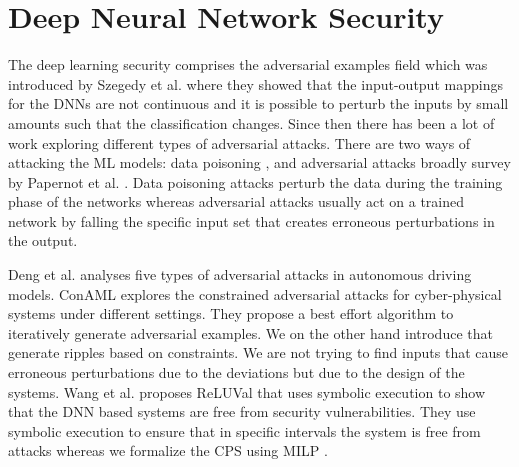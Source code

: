 \section{Deep Neural Network Security}

The deep learning security comprises the adversarial examples field which was introduced by Szegedy et al. \cite{Szegedy2013IntriguingPO} where they showed that the input-output mappings for the DNNs are not continuous and it is possible to perturb the inputs by small amounts such that the classification changes. Since then there has been a lot of work exploring different types of adversarial attacks. There are two ways of attacking the \ac{ML} models: data poisoning \cite{DBLP:journals/corr/abs-1903-01666}, and adversarial attacks broadly survey by Papernot et al. \cite{DBLP:journals/corr/PapernotMSW16}. Data poisoning attacks perturb the data during the training phase of the networks whereas adversarial attacks usually act on a trained network by falling the specific input set that creates erroneous perturbations in the output. 



 Deng et al. \cite{deng2020analysis} analyses five types of adversarial attacks in autonomous driving models.  ConAML \cite{li2020conaml} explores the constrained adversarial attacks for cyber-physical systems under different settings. They propose a best effort algorithm to iteratively generate adversarial examples. We on the other hand introduce \attack  that generate ripples based on constraints. We are not trying to find inputs that cause erroneous perturbations due to the deviations but due to the design of the systems. 
  Wang et al. \cite{217595} proposes ReLUVal that uses symbolic execution to show that the DNN based systems are free from security vulnerabilities. They use symbolic execution to ensure that in specific intervals the system is free from attacks whereas we formalize the \ac{CPS} using \ac{MILP} . 


